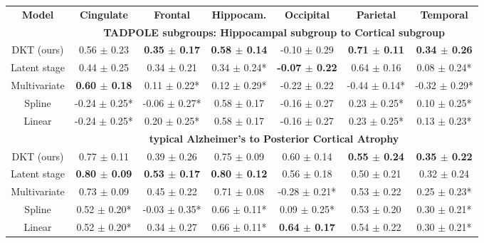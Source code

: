 \documentclass{llncs}
\begin{document}
\newcommand{\cw}{c}



\begin{table}
\centering
\fontsize{7}{10}\selectfont
\begin{tabular}{c | c c c c c c}
\textbf{Model} & \textbf{Cingulate} & \textbf{Frontal} & \textbf{Hippocam.} & \textbf{Occipital} & \textbf{Parietal} & \textbf{Temporal}\\
& \multicolumn{6}{c}{\textbf{TADPOLE subgroups: Hippocampal subgroup to Cortical subgroup}}\\
DKT (ours) &      0.56 $\pm$ 0.23 &    \textbf{0.35 $\pm$ 0.17} &        \textbf{0.58 $\pm$ 0.14} &     -0.10 $\pm$ 0.29 &     \textbf{0.71 $\pm$ 0.11} &     \textbf{0.34 $\pm$ 0.26} \\
Latent stage &      0.44 $\pm$ 0.25 &    0.34 $\pm$ 0.21 &       0.34 $\pm$ 0.24* &     \textbf{-0.07 $\pm$ 0.22} &     0.64 $\pm$ 0.16 &    0.08 $\pm$ 0.24* \\
Multivariate &      \textbf{0.60 $\pm$ 0.18} &   0.11 $\pm$ 0.22* &       0.12 $\pm$ 0.29* &     -0.22 $\pm$ 0.22 &   -0.44 $\pm$ 0.14* &   -0.32 $\pm$ 0.29* \\
Spline &    -0.24 $\pm$ 0.25* &  -0.06 $\pm$ 0.27* &        0.58 $\pm$ 0.17 &     -0.16 $\pm$ 0.27 &    0.23 $\pm$ 0.25* &    0.10 $\pm$ 0.25* \\
Linear &    -0.24 $\pm$ 0.25* &   0.20 $\pm$ 0.25* &        0.58 $\pm$ 0.17 &     -0.16 $\pm$ 0.27 &    0.23 $\pm$ 0.25* &    0.13 $\pm$ 0.23* \\
& \multicolumn{6}{c}{\textbf{typical Alzheimer's to Posterior Cortical Atrophy}}\\
DKT (ours) &    0.77 $\pm$ 0.11 &    0.39 $\pm$ 0.26 &      0.75 $\pm$ 0.09 &    0.60 $\pm$ 0.14 &    \textbf{0.55 $\pm$ 0.24} &    \textbf{0.35 $\pm$ 0.22} \\
Latent stage &    \textbf{0.80 $\pm$ 0.09} &    \textbf{0.53 $\pm$ 0.17} &      \textbf{0.80 $\pm$ 0.12} &    0.56 $\pm$ 0.18 &    0.50 $\pm$ 0.21 &    0.32 $\pm$ 0.24 \\
Multivariate &   0.73 $\pm$ 0.09 &   0.45 $\pm$ 0.22  &    0.71 $\pm$ 0.08 & -0.28 $\pm$ 0.21* &  0.53 $\pm$ 0.22  &  0.25 $\pm$ 0.23* \\
Spline &   0.52 $\pm$ 0.20* &  -0.03 $\pm$ 0.35* &     0.66 $\pm$ 0.11* &   0.09 $\pm$ 0.25* &    0.53 $\pm$ 0.20 &   0.30 $\pm$ 0.21* \\
Linear &   0.52 $\pm$ 0.20* &    0.34 $\pm$ 0.27 &     0.66 $\pm$ 0.11* &    \textbf{0.64 $\pm$ 0.17} &    0.54 $\pm$ 0.22 &   0.30 $\pm$ 0.21* \\

\end{tabular}
\end{table}
\end{document}
